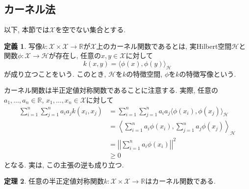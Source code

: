 \documentclass[uplatex]{jsarticle}
\theoremstyle{definition}
\newtheorem{definition}{定義}[section]
\newtheorem{theorem}[definition]{定理}
\numberwithin{equation}{section}
\newcommand{\R}{\mathbb{R}}
\newcommand{\norm}[1]{\left|\left|#1\right|\right|}
\begin{document}
\subsection{カーネル法}
以下, 本節では$\mathcal{X}$を空でない集合とする.
\begin{definition}
    写像$k \colon \mathcal{X} \times \mathcal{X} \to \R$が$\mathcal{X}$上のカーネル関数であるとは, 実Hilbert空間$\mathcal{H}$と関数$\phi \colon \mathcal{X} \to \mathcal{H}$が存在し, 任意の$x, y \in \mathcal{X}$に対して
    \begin{equation}
        k(x, y) = \langle\phi(x), \phi(y)\rangle_{\mathcal{H}}
    \end{equation}
    が成り立つことをいう.
    このとき, $\mathcal{H}$を$k$の特徴空間, $\phi$を$k$の特徴写像という.
\end{definition}
カーネル関数は半正定値対称関数であることに注意する.
実際, 任意の$a_{1}, \dots, a_{n} \in \R$, $x_{1}, \dots, x_{n} \in \mathcal{X}$に対して
\begin{align*}
    \sum_{i = 1}^{n} \sum_{j = 1}^{n} a_{i}a_{j}k(x_{i}, x_{j})
    &= \sum_{i = 1}^{n} \sum_{j = 1}^{n} a_{i}a_{j}\langle\phi(x_{i}), \phi(x_{j})\rangle_{\mathcal{H}} \\
    &= \left\langle\sum_{i = 1}^{n} a_{i}\phi(x_{i}), \sum_{j = 1}^{n} a_{j}\phi(x_{j})\right\rangle_{\mathcal{H}} \\
    &= \norm{\sum_{i = 1}^{n} a_{i}\phi(x_{i})}^{2} \\
    &\geq 0
\end{align*}
となる.
実は, この主張の逆も成り立つ.
\begin{theorem}
    任意の半正定値対称関数$k \colon \mathcal{X} \times \mathcal{X} \to \R$はカーネル関数である.
\end{theorem}
\end{document}
